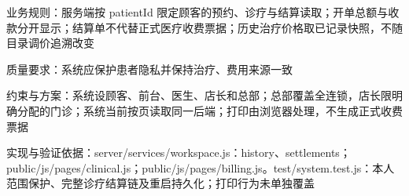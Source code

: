 \documentclass[UTF8,12pt,a4paper,fontset=none]{ctexart}
\begin{document}
业务规则：服务端按 patientId 限定顾客的预约、诊疗与结算读取；开单总额与收款分开显示；结算单不代替正式医疗收费票据；历史治疗价格取已记录快照，不随目录调价追溯改变\par
质量要求：系统应保护患者隐私并保持治疗、费用来源一致\par
约束与方案：系统设顾客、前台、医生、店长和总部；总部覆盖全连锁，店长限明确分配的门诊；系统当前按页读取同一后端；打印由浏览器处理，不生成正式收费票据\par
实现与验证依据：server/\allowbreak{}services/\allowbreak{}workspace.\allowbreak{}js：history、settlements；public/\allowbreak{}js/\allowbreak{}pages/\allowbreak{}clinical.\allowbreak{}js；public/\allowbreak{}js/\allowbreak{}pages/\allowbreak{}billing.\allowbreak{}js。test/\allowbreak{}system.\allowbreak{}test.\allowbreak{}js：本人范围保护、完整诊疗结算链及重启持久化；打印行为未单独覆盖\par
{}
\end{document}
